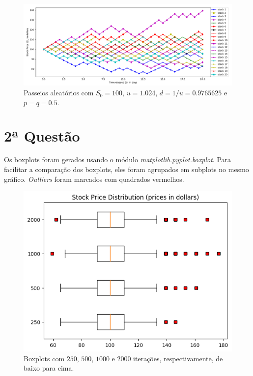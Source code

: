 \documentclass{article}
\begin{document}
\begin{figure}[]
	\includegraphics[width=\linewidth]{Figure_1.png}
	\centering
	
	\caption{Passeios aleatórios com $S_{0} = 100$, $u = 1.024$, $d = 1/u = 0.9765625$ e $p = q = 0.5$.}
	\label{}
\end{figure}



\section*{2ª Questão}

Os boxplots foram gerados usando o módulo \emph{matplotlib.pyplot.boxplot}.
Para facilitar a comparação dos boxplots, eles foram agrupados em subplots no mesmo gráfico.
\emph{Outliers} foram marcados com quadrados vermelhos.

\begin{figure}[H]
	\includegraphics[width=\linewidth]{fig1_250.png}
	\centering
	
	\caption{Boxplots com $250$, $500$, $1000$ e $2000$ iterações, respectivamente, de baixo para cima.}
	\label{}
\end{figure}
\end{document}
